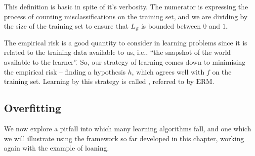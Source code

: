 This definition is basic in spite of it's verbosity. The numerator is expressing the process of counting misclassifications on the training set, and we are dividing by the size of the training set to ensure that $ L_{\mathcal{S}} $ is bounded between $ 0 $ and $ 1 $.

The empirical risk is a good quantity to consider in learning problems since it is related to the training data available to us, i.e., ``the snapshot of the world available to the learner''\cite{schwartz}. So, our strategy of learning comes down to minimising the empirical risk -- finding a hypothesis $ h $, which agrees well with $ f $ on the training set. Learning by this strategy is called , referred to by $ \mathrm{ERM} $.

\subsection{Overfitting}
We now explore a pitfall into which many learning algorithms fall, and one which we will illustrate using the framework so far developed in this chapter, working again with the example of loaning.

